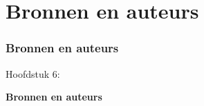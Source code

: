 %

\section{Bronnen en auteurs}
\begin{frame}[fragile]
	\frametitle{Bronnen en auteurs}

	\begin{center}\huge{Hoofdstuk 6:}\end{center}
	\begin{center}\huge{\color{typo3darkgrey}\textbf{Bronnen en auteurs}}\end{center}

\end{frame}


